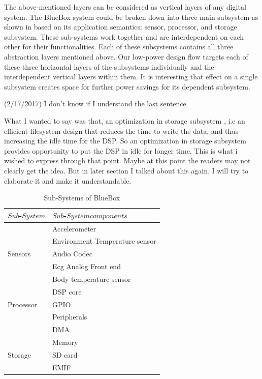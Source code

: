 The above-mentioned layers can be considered as vertical layers of
any digital system. The BlueBox system could be broken down into
three main subsystem as shown in  based on its
application semantics: sensor, processor, and storage subsystem.
These sub-systems work together and are interdependent on each other
for their functionalities. Each of these subsystems contains all
three abstraction layers mentioned above. Our low-power design flow
targets each of these three horizontal layers of the subsystems
individually and the interdependent vertical layers within them. It
is interesting that effect on a single subsystem creates space for
further power savings for its dependent subsystem. 
\begin{cmtPai}
	(2/17/2017) I don't know if I understand the last sentence
\end{cmtPai}
\begin{cmtSMS}
What I wanted to say was that, an optimization in storage subsystem ,
i.e an efficient filesystem design that reduces the time to write the
data, and thus increasing the idle time for the DSP. So an
optimization in storage subsystem provides opportunity to put the DSP
in idle for longer time. This is what i wished to express through
that point.  Maybe at this point the readers may not clearly get the
idea. But in later section I talked about this again. I will try to
elaborate it and make it understandable.
\end{cmtSMS}
  \begin{table}
 	\caption{Sub-Systems of BlueBox}
 	\label{table:sub-system}
 	\centering
 	\begin{tabular}{|l|l|}
 		\hline
 		$Sub$-$System$ & $Sub$-$System  components$  \\
 		\hline
 		& Accelerometer \\
 		& Environment Temperature sensor \\
 		Sensors & Audio Codec \\
 		& Ecg Analog Front end \\
 		& Body temperature sensor\\
 		\hline
 		& DSP core \\
 		Processor & GPIO \\
 		& Peripherals \\
 		& DMA \\
 		& Memory \\
 		\hline
 		Storage & SD card \\
 		& EMIF \\
 		\hline
 	\end{tabular}
 \end{table}
 
